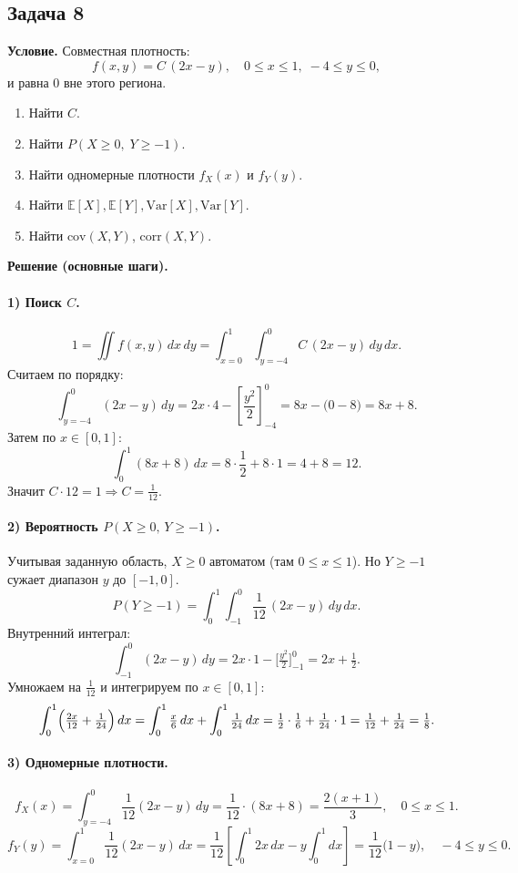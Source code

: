 \documentclass[12pt]{article}
\begin{document}
\subsection*{Задача 8}
\textbf{Условие.} Совместная плотность:
\[
f(x,y)=C\,(2x-y),\quad 0\le x\le 1,\;-4\le y\le 0,
\]
и равна 0 вне этого региона.

\begin{enumerate}
\item Найти \(C\).
\item Найти \(P(X\ge0,\;Y\ge-1)\).
\item Найти одномерные плотности \(f_X(x)\) и \(f_Y(y)\).
\item Найти \(\mathbb{E}[X], \mathbb{E}[Y], \mathrm{Var}[X], \mathrm{Var}[Y]\).
\item Найти \(\mathrm{cov}(X,Y)\), \(\mathrm{corr}(X,Y)\).
\end{enumerate}

\textbf{Решение (основные шаги).}

\paragraph{1) Поиск \(C\).}
\[
1=\iint f(x,y)\,dx\,dy
=\int_{x=0}^{1}\int_{y=-4}^{0} C\,(2x-y)\,dy\,dx.
\]
Считаем по порядку:
\[
\int_{y=-4}^0 (2x-y)\,dy 
=2x\cdot 4 - \left[\frac{y^2}{2}\right]_{-4}^{0} 
=8x - \bigl(0 - 8\bigr)=8x+8.
\]
Затем по \(x\in[0,1]\):
\[
\int_0^1(8x+8)\,dx=8\cdot\frac12+8\cdot1=4+8=12.
\]
Значит \(C\cdot12=1\Rightarrow C=\tfrac{1}{12}\).

\paragraph{2) Вероятность \(P(X\ge0,\,Y\ge-1)\).}
Учитывая заданную область, \(X\ge0\) автоматом (там \(0\le x\le1\)). Но \(Y\ge-1\) сужает диапазон \(y\) до \([-1,0]\).  
\[
P(Y\ge-1)
=\int_0^1\int_{-1}^{0}\frac1{12}\,(2x-y)\,dy\,dx.
\]
Внутренний интеграл:
\[
\int_{-1}^0(2x-y)\,dy=2x\cdot1-\bigl[\tfrac{y^2}{2}\bigr]_{-1}^{0} =2x +\tfrac12.
\]
Умножаем на \(\frac{1}{12}\) и интегрируем по \(x\in[0,1]\):
\[
\int_0^1\Bigl(\tfrac{2x}{12}+\tfrac{1}{24}\Bigr)\,dx
= \int_0^1 \tfrac{x}{6}\,dx + \int_0^1 \tfrac{1}{24}\,dx
= \tfrac12\cdot\tfrac{1}{6} + \tfrac{1}{24}\cdot1 = \tfrac{1}{12}+\tfrac{1}{24}=\tfrac{1}{8}.
\]

\paragraph{3) Одномерные плотности.}
\[
f_X(x)=\int_{y=-4}^0 \frac1{12}(2x-y)\,dy=\frac1{12}\cdot(8x+8)=\frac{2(x+1)}{3},\quad 0\le x\le1.
\]
\[
f_Y(y)=\int_{x=0}^1 \frac1{12}(2x-y)\,dx=\frac1{12}\left[\int_0^1 2x\,dx -y\int_0^1 dx\right]
=\frac1{12}\bigl(1-y\bigr),\quad -4\le y\le0.
\]
\end{document}
